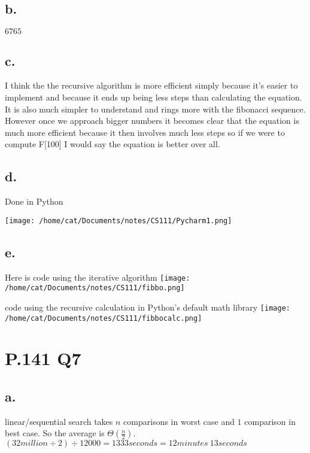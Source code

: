 \documentclass{article}%
\begin{document}
\newpage

\subsection*{b.}
$6765$

\subsection*{c.}
I think the the recursive algorithm is more efficient simply because it's easier to implement and because it ends up being less steps than calculating the equation. It is also much simpler to understand and rings more with the fibonacci sequence. However once we approach bigger numbers it becomes clear that the equation is much more efficient because it then involves much less steps so if we were to compute F[100] I would say the equation is better over all. 
\subsection*{d.}
Done in Python
\newline
\begin{center}
\texttt{[image: /home/cat/Documents/notes/CS111/Pycharm1.png]}
\end{center}


\subsection*{e.}
Here is code using the iterative algorithm \newline
\texttt{[image: /home/cat/Documents/notes/CS111/fibbo.png]}

code using the recursive calculation in Python's default math library \newline
\texttt{[image: /home/cat/Documents/notes/CS111/fibbocalc.png]}
\newpage

\newpage
\section*{P.141 Q7}
\subsection*{a.}
linear/sequential search takes $n$ comparisons in worst case and $1$ comparison in best case. So the average is $\Theta(\frac{n}{2})$. $(32million \div 2)\div 12000 = 1333seconds = 12minutes\ 13seconds$
\end{document}
